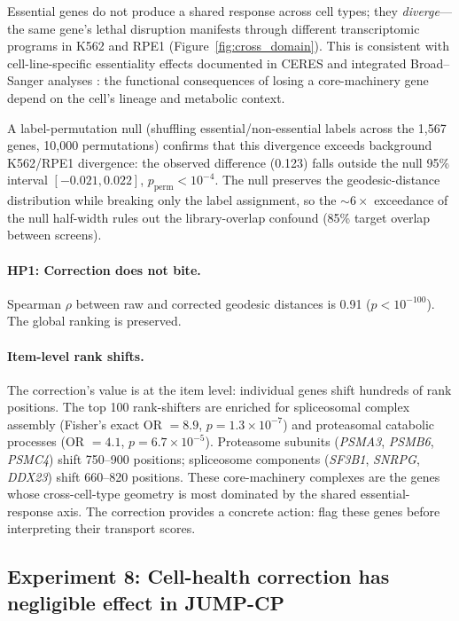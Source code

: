 \documentclass{article}
\begin{document}
Essential genes do not produce a shared response across cell types; they
\emph{diverge}---the same gene's lethal disruption manifests through
different transcriptomic programs in K562 and RPE1
(Figure~\ref{fig:cross_domain}). This is consistent with cell-line-specific
essentiality effects documented in CERES \citep{meyers2017ceres} and
integrated Broad--Sanger analyses \citep{pacini2021integrated}: the
functional consequences of losing a core-machinery gene depend on
the cell's lineage and metabolic context.

A label-permutation null (shuffling essential/non-essential labels across
the 1{,}567 genes, 10{,}000 permutations) confirms that this divergence
exceeds background K562/RPE1 divergence: the observed difference (0.123)
falls outside the null 95\% interval $[-0.021, 0.022]$,
$p_{\text{perm}} < 10^{-4}$. The null preserves the geodesic-distance
distribution while breaking only the label assignment, so the ${\sim}6\times$
exceedance of the null half-width rules out the library-overlap confound
(85\% target overlap between screens).

\paragraph{HP1: Correction does not bite.}
Spearman $\rho$ between raw and corrected geodesic distances is 0.91
($p < 10^{-100}$). The global ranking is preserved.

\paragraph{Item-level rank shifts.}
The correction's value is at the item level: individual genes shift
hundreds of rank positions. The top 100 rank-shifters are enriched for
spliceosomal complex assembly (Fisher's exact OR $= 8.9$,
$p = 1.3 \times 10^{-7}$) and proteasomal catabolic processes
(OR $= 4.1$, $p = 6.7 \times 10^{-5}$). Proteasome subunits
(\emph{PSMA3}, \emph{PSMB6}, \emph{PSMC4}) shift 750--900 positions;
spliceosome components (\emph{SF3B1}, \emph{SNRPG}, \emph{DDX23}) shift
660--820 positions. These core-machinery complexes are the genes whose
cross-cell-type geometry is most dominated by the shared essential-response
axis. The correction provides a concrete action: flag these genes before
interpreting their transport scores.

\subsection{Experiment 8: Cell-health correction has negligible
effect in JUMP-CP}
\end{document}
